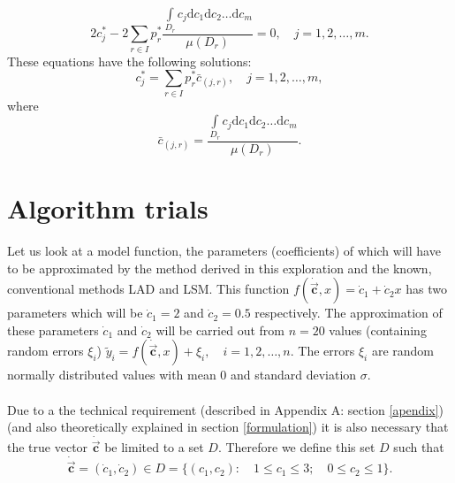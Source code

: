 \documentclass[11pt,a4paper]{article}
\numberwithin{equation}{subsection}
\newcommand{\vecc}{\vec{\textbf{c}}}
\begin{document}
\begin{equation}
2 c_{j}^{*} - 2 \sum\limits_{r \in I} p_{r}^{*}\frac{\int\limits_{D_{r}} c_{j}\mathrm{d}c_{1}\mathrm{d}c_{2}\dots\mathrm{d}c_{m}}{\mu(D_{r})} = 0, \quad j = 1,2,\dots,m.
\end{equation}
These equations have the following solutions:
\begin{equation}
c_{j}^{*} = \sum\limits_{r \in I} p_{r}^{*} \bar{c}_{(j,r)}, \quad j = 1,2,\dots,m, \label{eq-solutions-to-cj*}
\end{equation}
where
\begin{equation}
\bar{c}_{(j,r)} = \frac{\int\limits_{D_{r}} c_{j}\mathrm{d}c_{1}\mathrm{d}c_{2}\dots\mathrm{d}c_{m}}{\mu(D_{r})}. \label{eq-cbar}
\end{equation}

\section{Algorithm trials}
Let us look at a model function, the parameters (coefficients) of which will have to be approximated by the method derived in this exploration and the known, conventional methods LAD and LSM. This function $f(\dot{\vecc},x) = \dot{c}_1 + \dot{c}_2x$ has two parameters which will be $\dot{c}_1=2$ and $\dot{c}_2=0.5$ respectively. The approximation of these parameters $\dot{c}_1$ and $\dot{c}_2$ will be carried out from $n=20$ values (containing random errors $\xi_i$) $\tilde{y}_{i} = f(\dot{\vecc},x)+\xi_{i}, \quad i=1,2,\dots,n$. The errors $\xi_i$ are random normally distributed values with mean 0 and standard deviation $\sigma$.\\
\\
Due to a the technical requirement (described in Appendix A: section \vref{apendix}) (and also theoretically explained in section \vref{formulation}) it is also necessary that the true vector $\dot{\vecc}$ be limited to a set $D$. Therefore we define this set $D$ such that
\begin{equation}
\dot{\vecc} =  (\dot{c}_1 ,\dot{c}_2) \in D = \{ (c_1 ,c_2) : \quad 1 \leqslant c_1 \leqslant 3; \quad 0 \leqslant c_2 \leqslant 1 \}.
\end{equation}
\end{document}
